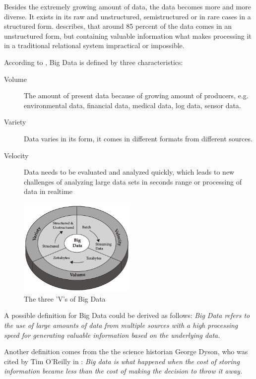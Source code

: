 Besides the extremely growing amount of data, the data becomes more and more diverse.
It exists in its raw and unstructured, semistructured or in rare cases in a structured form.
\cite{Bitk12} describes, that around 85 percent of the data comes in an unstructured
form, but containing valuable information what makes processing it in a traditional
relational system impractical or impossible.

According to \cite{Marz15} \cite{Ziko12}, Big Data is defined by three characteristics:
\begin{description}
    \item [Volume] The amount of present data because of growing amount of producers,
    e.g. environmental data, financial data, medical data, log data, sensor data.
    \item [Variety] Data varies in its form, it comes in different formats from different sources.
    \item [Velocity] Data needs to be evaluated and analyzed quickly, which leads to new challenges
    of analyzing large data sets in seconds range or processing of data in realtime
\end{description}
\begin{figure}[H]
	\centering
	\includegraphics[width=0.5\textwidth]{../images/03-three-vs-of-bigdata.png}
	\caption{The three 'V's of Big Data{\cite{Ziko12}}}
	\label{three-vs-of-bigdata}
\end{figure}

A possible definition for Big Data could be derived as follows: \textit{Big Data refers to the use
of large amounts of data from multiple sources with a high processing speed for generating
valuable information based on the underlying data.}

Another definition comes from the the science historian George Dyson, who was cited by
Tim O'Reilly in \cite{Dys13}:
\textit{Big data is what happened when the cost of storing information became less than the
cost of making the decision to throw it away.}

